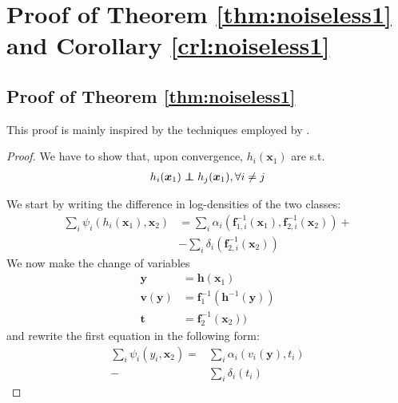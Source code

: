 \section{Proof of Theorem \ref{thm:noiseless1} and Corollary \ref{crl:noiseless1}}
\label{appendix:thm_noiseless}

\subsection{Proof of Theorem \ref{thm:noiseless1}}\label{appendix:proof-thm1}
This proof is mainly inspired by the techniques employed by \cite{hyvarinen19a}.

\begin{proof}
We have to
show that, upon convergence, $h_{i}(\bm{x}_{1})$ are s.t.
\begin{align*}
h_{i}(\bm{x}_{1})\independent h_{j}(\bm{x}_{1}),\forall i\neq j
\end{align*}

We start by writing the difference in log-densities of the two classes:
\begin{align*}
\sum_{i}\psi_{i}(h_{i}(\bm{x}_{1}),\bm{x}_{2})  &=\sum_{i}\alpha_{i}(\bm{f}_{1,i}^{-1}(\bm{x}_{1}), \bm{f}_{2,i}^{-1}(\bm{x}_{2}))+\\
&-\sum_{i}\delta_{i}( \bm{f}_{2,i}^{-1}(\bm{x}_{2}))
\end{align*}
We now make the change of variables
\begin{align*}
\bm{y} & =\bm{h}(\bm{x}_{1})\\
\bm{v}(\bm{y}) & =\bm{f}_{1}^{-1}(\bm{h}^{-1}(\bm{y}))\\
\bm{t} & = \bm{f}_{2}^{-1}(\bm{x}_{2}))
\end{align*}
and rewrite the first equation in the following form:
\begin{align}
\sum_{i}\psi_{i}(y_{i},\bm{x}_{2})=&\sum_{i}\alpha_{i}(v_{i}(\bm{y}), t_{i})\\
-&\sum_{i}\delta_{i}( t_{i})
\end{align}


\end{proof}
